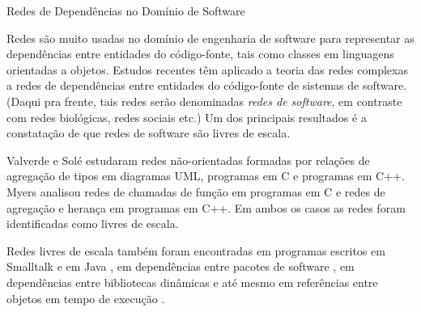 \begin{section}{Redes de Dependências no Domínio de Software}

	Redes são muito usadas no domínio de engenharia de software para representar as dependências entre entidades do código-fonte, tais como classes em linguagens orientadas a objetos. 
	Estudos recentes têm aplicado a teoria das redes complexas a redes de dependências entre entidades do código-fonte de sistemas de software. 
	(Daqui pra frente, tais redes serão denominadas \emph{redes de software}, em contraste com redes biológicas, redes sociais etc.) Um dos principais resultados é a constatação de que redes de software são livres de escala.
	
	Valverde e Solé \cite{Valverde2003} estudaram redes não-orientadas formadas por relações de agregação de tipos em diagramas UML, programas em C e programas em C++. Myers \cite{Myers2003} analisou redes de chamadas de função em programas em C e redes de agregação e herança em programas em C++. Em ambos os casos as redes foram identificadas como livres de escala. 

	Redes livres de escala também foram encontradas em programas escritos em Smalltalk \cite{Marchesi2004,Concas2007} e em Java \cite{Hyland-Wood2006,Baxter2006,Ichii2008}, em dependências entre pacotes de software \cite{Labelle2004}, em dependências entre bibliotecas dinâmicas \cite{Louridas2008} e até mesmo em referências entre objetos em tempo de execução \cite{Potanin2005}.
\end{section}


